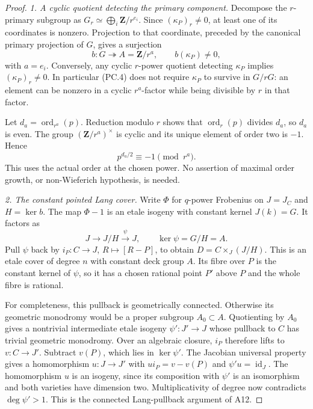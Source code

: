 \documentclass[11pt,a4paper]{article}
\begin{document}
\begin{proof}
\emph{1. A cyclic quotient detecting the primary component.}
Decompose the $r$-primary subgroup as
$G_r\simeq\bigoplus_i\mathbf Z/r^{e_i}$.
Since $(\kappa_P)_r\ne0$, at least one of its coordinates is
nonzero. Projection to that coordinate, preceded by the canonical
primary projection of $G$, gives a surjection
\[
 b:G\twoheadrightarrow A=\mathbf Z/r^a,
 \qquad b(\kappa_P)\ne0,
 \tag{PC.4}
\]
with $a=e_i$. Conversely, any cyclic $r$-power quotient detecting
$\kappa_P$ implies $(\kappa_P)_r\ne0$.
In particular (PC.4) does not require $\kappa_P$ to survive in
$G/rG$: an element can be nonzero in a cyclic $r^a$-factor while
being divisible by $r$ in that factor.

Let $d_a=\operatorname{ord}_{r^a}(p)$. Reduction modulo $r$
shows that $\operatorname{ord}_r(p)$ divides $d_a$, so $d_a$ is
even. The group $(\mathbf Z/r^a)^\times$ is cyclic and its
unique element of order two is $-1$. Hence
\[
                  p^{d_a/2}\equiv-1\pmod{r^a}.
 \tag{PC.5}
\]
This uses the actual order at the chosen power. No assertion of
maximal order growth, or non-Wieferich hypothesis, is needed.

\emph{2. The constant pointed Lang cover.}
Write $\Phi$ for $q$-power Frobenius on $J=J_C$ and
$H=\ker b$. The map $\Phi-1$ is an etale isogeny with constant
kernel $J(k)=G$. It factors as
\[
 J\longrightarrow J/H\xrightarrow{\psi}J,
 \qquad \ker\psi=G/H=A.
\]
Pull $\psi$ back by $i_P:C\to J$, $R\mapsto[R-P]$, to obtain
$D=C\times_{J}(J/H)$. This is an etale cover of degree $n$ with
constant deck group $A$. Its fibre over $P$ is the constant kernel
of $\psi$, so it has a chosen rational point $P'$ above $P$ and
the whole fibre is rational.

For completeness, this pullback is geometrically connected.
Otherwise its geometric monodromy would be a proper subgroup
$A_0\subset A$. Quotienting by $A_0$ gives a nontrivial intermediate
etale isogeny $\psi':J'\to J$ whose pullback to $C$ has trivial
geometric monodromy. Over an algebraic closure, $i_P$ therefore
lifts to $v:C\to J'$. Subtract $v(P)$, which lies in $\ker\psi'$.
The Jacobian universal property gives a homomorphism $u:J\to J'$
with $u i_P=v-v(P)$ and $\psi'u=\operatorname{id}_J$.
The homomorphism $u$ is an isogeny, since its composition with
$\psi'$ is an isomorphism and both varieties have dimension two.
Multiplicativity of degree now contradicts $\deg\psi'>1$.
This is the connected Lang-pullback argument of A12.


\end{proof}
\end{document}
